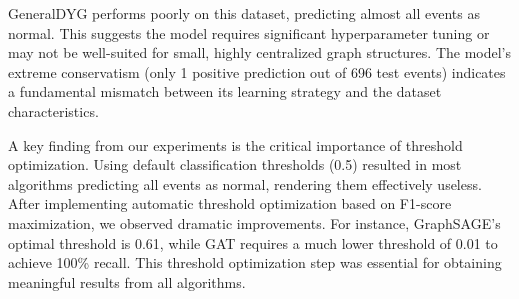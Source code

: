 GeneralDYG performs poorly on this dataset, predicting almost all events as normal. This suggests the model requires significant hyperparameter tuning or may not be well-suited for small, highly centralized graph structures. The model's extreme conservatism (only 1 positive prediction out of 696 test events) indicates a fundamental mismatch between its learning strategy and the dataset characteristics.

A key finding from our experiments is the critical importance of threshold optimization. Using default classification thresholds (0.5) resulted in most algorithms predicting all events as normal, rendering them effectively useless. After implementing automatic threshold optimization based on F1-score maximization, we observed dramatic improvements. For instance, GraphSAGE's optimal threshold is 0.61, while GAT requires a much lower threshold of 0.01 to achieve 100\% recall. This threshold optimization step was essential for obtaining meaningful results from all algorithms.
